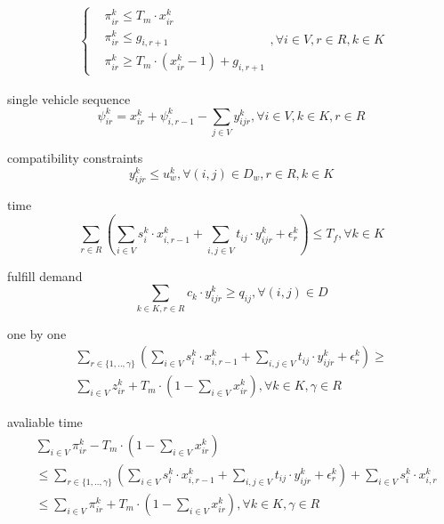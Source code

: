 \documentclass[preprint,12pt,authoryear]{elsarticle}
\begin{document}
\begin{equation}
    \begin{split}
        \begin{cases}
            & \pi_{ir}^k\leq T_m\cdot x_{ir}^k \\
            & \pi_{ir}^k\leq g_{i,r+1} \\
            & \pi_{ir}^k\geq T_m\cdot(x_{ir}^k -1) + g_{i,r+1}
        \end{cases},  \forall i\in V, r\in R, k\in K
    \end{split}
    \label{nlpi}
\end{equation}

single vehicle sequence
\begin{equation}
    \psi_{ir}^k=x_{ir}^k+\psi_{i,r-1}^k-\sum_{j\in V}{y_{ijr}^k},\forall i\in V,k\in K,r\in R
\label{svsy}
\end{equation}

compatibility constraints
\begin{equation}
    y_{ijr}^k\leq u_w^k, \forall (i,j)\in D_w, r\in R, k\in K
\label{ccy}
\end{equation}

time
\begin{equation}
    \sum_{r\in R}{(
        \sum_{i\in V}{s_i^k\cdot x_{i,r-1}^k}
        +\sum_{i,j\in V}{t_{ij}\cdot y_{ijr}^k}
        +\epsilon_r^k
    )}
    \leq T_f,
    \forall k\in K
\label{tmy}
\end{equation}

fulfill demand
\begin{equation}
    \sum_{k\in K,r\in R}{c_k\cdot y_{ijr}^k}\geq q_{ij}, \forall (i,j)\in D
\label{fdy}
\end{equation}

one by one
\begin{equation}
    \begin{split}
        \sum_{r\in \{1,..,\gamma\}}{(
            \sum_{i\in V}{s_i^k\cdot x_{i,r-1}^k}
            +\sum_{i,j\in V}{t_{ij}\cdot y_{ijr}^k}
            +\epsilon_r^k
        )} \geq \\
        \sum_{i\in V}{z_{ir}^k}+T_m\cdot(1-\sum_{i\in V}{x_{ir}^k}),
        \forall k\in K,\gamma \in R
    \end{split}
\label{1b1y}
\end{equation}

avaliable time
\begin{equation}
    \begin{split}
        &\sum_{i\in V}{\pi_{ir}^k}-T_m\cdot(1-\sum_{i\in V}{x_{ir}^k})\\
        &\leq \sum_{r\in \{1,..,\gamma\}}{(
            \sum_{i\in V}{s_i^k\cdot x_{i,r-1}^k}
            +\sum_{i,j\in V}{t_{ij}\cdot y_{ijr}^k}
            +\epsilon_r^k
        )}  + \sum_{i\in V}{s_i^k\cdot x_{i,r}^k}\\
        &\leq \sum_{i\in V}{\pi_{ir}^k}+T_m\cdot(1-\sum_{i\in V}{x_{ir}^k}),
        \forall k\in K,\gamma \in R
    \end{split}
\label{avltyz}
\end{equation}
\end{document}
